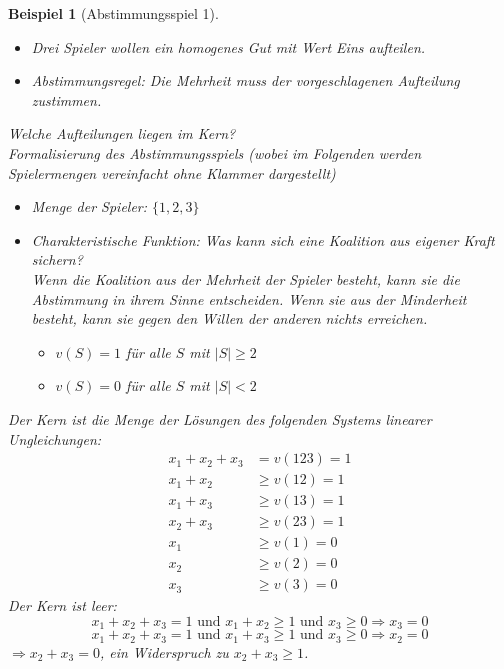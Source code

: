 \documentclass[12pt]{extreport} %
\theoremstyle{named}
\theoremstyle{itshape}
\theoremstyle{normal}
\newtheorem{beispiel}[unnamedtheorem]{Beispiel}
\begin{document}
\begin{beispiel}[Abstimmungsspiel 1] ~\
	\begin{itemize}
		\item Drei Spieler wollen ein homogenes Gut mit Wert Eins aufteilen. 
		\item Abstimmungsregel: Die Mehrheit muss der vorgeschlagenen Aufteilung zustimmen.
	\end{itemize}
	Welche Aufteilungen liegen im Kern? ~\\
	
	Formalisierung des Abstimmungsspiels (wobei im Folgenden werden Spielermengen vereinfacht ohne Klammer dargestellt)
	\begin{itemize}
		\item Menge der Spieler: $\{1, 2, 3\}$
		\item Charakteristische Funktion: Was kann sich eine Koalition aus eigener Kraft sichern? ~\\
			Wenn die Koalition aus der Mehrheit der Spieler besteht, kann sie die Abstimmung in ihrem Sinne entscheiden. Wenn sie aus der Minderheit besteht, kann sie gegen den Willen der anderen nichts erreichen.
				\begin{itemize}
					\item $v(S) = 1$ für alle $S$ mit $|S| \geq 2$
					\item $v(S) = 0$ für alle $S$ mit $|S| < 2$
				\end{itemize}
	\end{itemize}
	Der Kern ist die Menge der Lösungen des folgenden Systems linearer Ungleichungen:
	\begin{align*}
		x_1 + x_2 + x_3 & = v(123) = 1 \\
		x_1 + x_2 & \geq v(12) = 1 \\
		x_1 + x_3 & \geq v(13) = 1 \\
		x_2 + x_3 & \geq v(23) = 1 \\
		x_1 & \geq v(1) = 0 \\
		x_2 & \geq v(2) = 0 \\
		x_3 & \geq v(3) = 0 		
	\end{align*}
	Der Kern ist leer:
	$$ x_1 + x_2 + x_3 = 1 \text{ und } x_1 + x_2 \geq 1 \text{ und } x_3 \geq 0 \Rightarrow x_3 = 0 $$
	$$ x_1 + x_2 + x_3 = 1 \text{ und } x_1 + x_3 \geq 1 \text{ und } x_3 \geq 0 \Rightarrow x_2 = 0 $$
	$\Rightarrow x_2 + x_3 = 0$, ein Widerspruch zu $x_2 + x_3 \geq 1$.
\end{beispiel}
 
\end{document}
